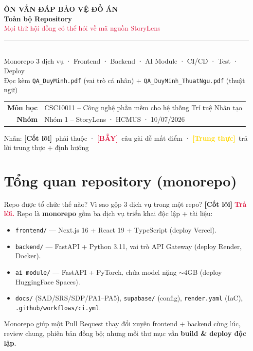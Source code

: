 \documentclass[11pt]{article}
\newcommand{\code}[1]{\texttt{\small #1}}
\newcommand{\B}[1]{\textbf{#1}}
\newcommand{\tagCore}{\textcolor{steel}{\footnotesize\textbf{[Cốt lõi]}}}
\newcommand{\tagTrap}{\textcolor{crimson}{\footnotesize\textbf{[BẪY]}}}
\newcommand{\tagHonest}{\textcolor{gold}{\footnotesize\textbf{[Trung thực]}}}
\newcommand{\A}{\textbf{\textcolor{crimson}{Trả lời. }}}
\begin{document}
\begin{titlepage}
\centering
\vspace*{2.0cm}
{\headfont\bfseries\fontsize{15}{18}\selectfont\textcolor{soft}{ÔN VẤN ĐÁP BẢO VỆ ĐỒ ÁN}}\\[6pt]
{\headfont\bfseries\fontsize{34}{38}\selectfont\textcolor{ink}{Toàn bộ Repository}}\\[6pt]
{\large\headfont\textcolor{crimson}{Mọi thứ hội đồng có thể hỏi về mã nguồn StoryLens}}\\[10pt]
{\color{crimson}\rule{9cm}{2pt}}\\[10pt]
{\large Monorepo 3 dịch vụ · Frontend · Backend · AI Module · CI/CD · Test · Deploy}\\[4pt]
{\color{soft}\large Đọc kèm \texttt{QA\_DuyMinh.pdf} (vai trò cá nhân) + \texttt{QA\_DuyMinh\_ThuatNgu.pdf} (thuật ngữ)}\\[2.0cm]
\begin{tabular}{rl}
\textbf{Môn học} & CSC10011 -- Công nghệ phần mềm cho hệ thống Trí tuệ Nhân tạo\\[3pt]
\textbf{Nhóm} & Nhóm 1 -- StoryLens · HCMUS · 10/07/2026\\
\end{tabular}
\vfill
{\color{soft}\small Nhãn: \tagCore\ phải thuộc · \tagTrap\ câu gài dễ mất điểm · \tagHonest\ trả lời trung thực + định hướng}
\end{titlepage}

\tableofcontents
\newpage

\section{Tổng quan repository (monorepo)}

\begin{qa}{Repo được tổ chức thế nào? Vì sao gộp 3 dịch vụ trong một repo? \tagCore}
\A Repo là \B{monorepo} gồm ba dịch vụ triển khai độc lập + tài liệu:
\begin{itemize}
  \item \code{frontend/} --- Next.js 16 + React 19 + TypeScript (deploy Vercel).
  \item \code{backend/} --- FastAPI + Python 3.11, vai trò API Gateway (deploy Render, Docker).
  \item \code{ai\_module/} --- FastAPI + PyTorch, chứa model nặng $\sim$4GB (deploy HuggingFace Spaces).
  \item \code{docs/} (SAD/SRS/SDP/PA1--PA5), \code{supabase/} (config), \code{render.yaml} (IaC), \code{.github/workflows/ci.yml}.
\end{itemize}
Monorepo giúp một Pull Request thay đổi xuyên frontend + backend cùng lúc, review chung, phiên bản đồng bộ; nhưng mỗi thư mục vẫn \B{build \& deploy độc lập}.
\end{qa}
\end{document}
